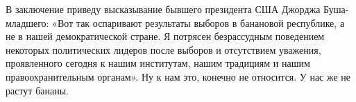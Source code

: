 В заключение приведу высказывание бывшего президента США Джорджа Буша-младшего:
«Вот так оспаривают результаты выборов в банановой республике, а не в нашей
демократической стране. Я потрясен безрассудным поведением некоторых
политических лидеров после выборов и отсутствием уважения, проявленного сегодня
к нашим институтам, нашим традициям и нашим правоохранительным органам». Ну к
нам это, конечно не относится. У нас же не растут бананы.
